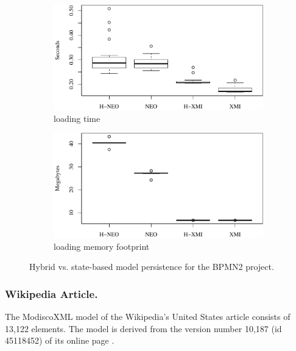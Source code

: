 \documentclass{llncs}
\begin{document}
\begin{figure}[ht]
    \begin{subfigure}{0.49\linewidth}
        \includegraphics[width=\linewidth]{images/load_time_bpmn2}
        \caption{loading time}
        \label{fig:load_time_bpmn2}
    \end{subfigure}
    \begin{subfigure}{0.49\linewidth}
        \includegraphics[width=\linewidth]{images/load_memory_bpmn2}
        \caption{loading memory footprint}
        \label{fig:load_memory_bpmn2}
    \end{subfigure}
\caption{Hybrid vs. state-based model persistence for the BPMN2 project.}
\end{figure}

\subsubsection{Wikipedia Article.}
\label{sec:model_loading_time_wikipedia}

The ModiscoXML model of the Wikipedia's United States article consists of 13,122 elements. The model is derived from the version number 10,187 (id 45118452) of its online page \cite{wikipedia2018us}. 
\end{document}
